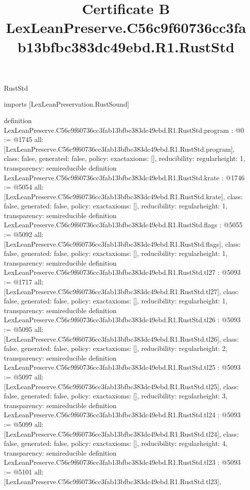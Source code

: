 \begin{lexlean}{RustStd}
\title{Certificate B LexLeanPreserve.C56c9f60736cc3fab13bfbc383dc49ebd.R1.RustStd}
\begin{coremodule}
imports [LexLeanPreservation.RustSound]

definition LexLeanPreserve.C56c9f60736cc3fab13bfbc383dc49ebd.R1.RustStd.program : @0 := @1745 {
  all: [LexLeanPreserve.C56c9f60736cc3fab13bfbc383dc49ebd.R1.RustStd.program],
  class: false,
  generated: false,
  policy: exact{axioms: []},
  reducibility: regular{height: 1},
  transparency: semireducible
}
definition LexLeanPreserve.C56c9f60736cc3fab13bfbc383dc49ebd.R1.RustStd.krate : @1746 := @5054 {
  all: [LexLeanPreserve.C56c9f60736cc3fab13bfbc383dc49ebd.R1.RustStd.krate],
  class: false,
  generated: false,
  policy: exact{axioms: []},
  reducibility: regular{height: 1},
  transparency: semireducible
}
definition LexLeanPreserve.C56c9f60736cc3fab13bfbc383dc49ebd.R1.RustStd.flags : @5055 := @5092 {
  all: [LexLeanPreserve.C56c9f60736cc3fab13bfbc383dc49ebd.R1.RustStd.flags],
  class: false,
  generated: false,
  policy: exact{axioms: []},
  reducibility: regular{height: 1},
  transparency: semireducible
}
definition LexLeanPreserve.C56c9f60736cc3fab13bfbc383dc49ebd.R1.RustStd.tl27 : @5093 := @1717 {
  all: [LexLeanPreserve.C56c9f60736cc3fab13bfbc383dc49ebd.R1.RustStd.tl27],
  class: false,
  generated: false,
  policy: exact{axioms: []},
  reducibility: regular{height: 1},
  transparency: semireducible
}
definition LexLeanPreserve.C56c9f60736cc3fab13bfbc383dc49ebd.R1.RustStd.tl26 : @5093 := @5095 {
  all: [LexLeanPreserve.C56c9f60736cc3fab13bfbc383dc49ebd.R1.RustStd.tl26],
  class: false,
  generated: false,
  policy: exact{axioms: []},
  reducibility: regular{height: 2},
  transparency: semireducible
}
definition LexLeanPreserve.C56c9f60736cc3fab13bfbc383dc49ebd.R1.RustStd.tl25 : @5093 := @5097 {
  all: [LexLeanPreserve.C56c9f60736cc3fab13bfbc383dc49ebd.R1.RustStd.tl25],
  class: false,
  generated: false,
  policy: exact{axioms: []},
  reducibility: regular{height: 3},
  transparency: semireducible
}
definition LexLeanPreserve.C56c9f60736cc3fab13bfbc383dc49ebd.R1.RustStd.tl24 : @5093 := @5099 {
  all: [LexLeanPreserve.C56c9f60736cc3fab13bfbc383dc49ebd.R1.RustStd.tl24],
  class: false,
  generated: false,
  policy: exact{axioms: []},
  reducibility: regular{height: 4},
  transparency: semireducible
}
definition LexLeanPreserve.C56c9f60736cc3fab13bfbc383dc49ebd.R1.RustStd.tl23 : @5093 := @5101 {
  all: [LexLeanPreserve.C56c9f60736cc3fab13bfbc383dc49ebd.R1.RustStd.tl23],
}
\end{coremodule}
\end{lexlean}
